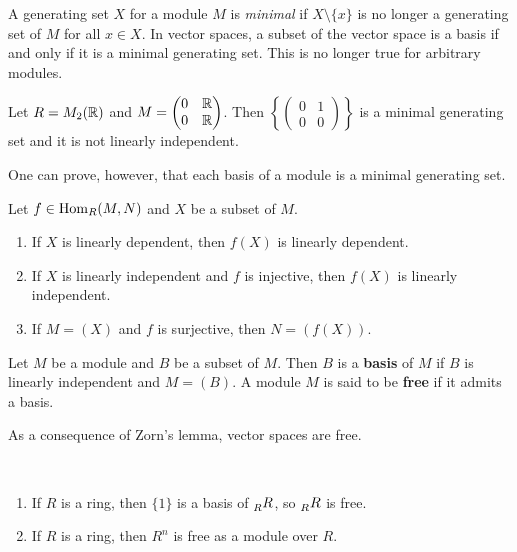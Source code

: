 A generating set $X$ for a module $M$ is \emph{minimal} if 
$X\setminus\{x\}$ is no longer a generating set of $M$ for all $x\in X$. 
In vector spaces, a subset of the vector space is a basis
if and only if it is a minimal generating set. This is no longer true 
for arbitrary modules.

\begin{examples}
Let $R=M_2(\mathbb{R})$ and $M=\begin{pmatrix}
        0&\mathbb{R}\\
        0&\mathbb{R} 
    \end{pmatrix}$. Then $\left\{\begin{pmatrix}0&1\\0&0\end{pmatrix}\right\}$ is a minimal generating 
    set and it is not linearly independent. 
\end{examples}

One can prove, however, that each 
basis of a module is a minimal generating set. 

\begin{exercise}
\label{xca:LI}
    Let $f\in\operatorname{Hom}_R(M,N)$ and $X$ be a subset of $M$. 
    \begin{enumerate}
        \item If $X$ is linearly dependent, then $f(X)$ is linearly dependent.
        \item If $X$ is linearly independent and $f$ is injective, then $f(X)$ is linearly independent. 
        \item If $M=(X)$ and $f$ is surjective, then $N=(f(X))$. 
    \end{enumerate}
\end{exercise}

\begin{definition}
    Let $M$ be a module and $B$ be a subset of $M$. Then $B$ is a \textbf{basis} of $M$ if
    $B$ is linearly independent and $M=(B)$. A module $M$ is said to be \textbf{free} if it admits a basis.   
\end{definition}

As a consequence of Zorn's lemma, 
vector spaces are free. 

\begin{examples}\
\begin{enumerate}
    \item If $R$ is a ring, then $\{1\}$ is a basis of $\prescript{}{R}{R}$, so $\prescript{}{R}{R}$ is free.
    \item If $R$ is a ring, then $R^n$ is free as a module over $R$. 
\end{enumerate}
\end{examples}

